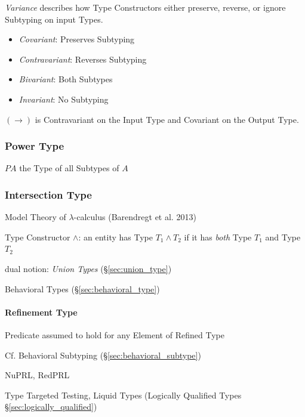 \emph{Variance} describes how Type Constructors either preserve,
reverse, or ignore Subtyping on input Types.

\begin{itemize}
  \item \emph{Covariant}: Preserves Subtyping
  \item \emph{Contravariant}: Reverses Subtyping
  \item \emph{Bivariant}: Both Subtypes
  \item \emph{Invariant}: No Subtyping
\end{itemize}

$(\rightarrow)$ is Contravariant on the Input Type and Covariant on
the Output Type.



\subsubsection{Power Type}\label{sec:power_type}

$P A$ the Type of all Subtypes of $A$



\subsubsection{Intersection Type}\label{sec:intersection_type}

Model Theory of $\lambda$-calculus (Barendregt et al. 2013)

Type Constructor $\wedge$: an entity has Type $T_1 \wedge T_2$ if it
has \emph{both} Type $T_1$ and Type $T_2$


dual notion: \emph{Union Types} (\S\ref{sec:union_type})

\fist Behavioral Types (\S\ref{sec:behavioral_type})



\paragraph{Refinement Type}\label{sec:refinement_type}\hfill


Predicate assumed to hold for any Element of Refined Type

\fist Cf. Behavioral Subtyping (\S\ref{sec:behavioral_subtype})

NuPRL, RedPRL

Type Targeted Testing, Liquid Types (Logically Qualified Types
\S\ref{sec:logically_qualified})


